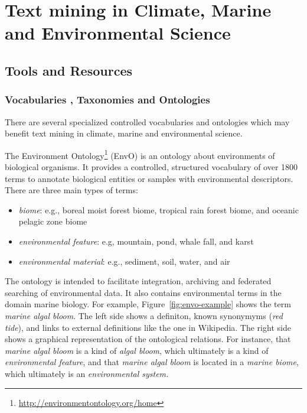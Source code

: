 \chapter{Text mining in Climate, Marine and Environmental Science}



\section{Tools and Resources}

\subsection{Vocabularies , Taxonomies and Ontologies}

There are several specialized controlled vocabularies and ontologies which may benefit text mining in climate, marine and environmental science.
 
The Environment Ontology\footnote{\url{http://environmentontology.org/home}} (EnvO) is an ontology about environments  \citep{Buttigieg2013Environment} of biological organisms.
It provides a controlled, structured vocabulary of over 1800 terms to annotate biological entities or samples with environmental descriptors.
There are three main types of terms:

\begin{itemize}
\item \emph{biome}: e.g., boreal moist forest biome, tropical rain forest biome, and oceanic pelagic zone biome 
\item \emph{environmental feature}: e.g, mountain, pond, whale fall, and karst
\item \emph{environmental material}: e.g., sediment, soil, water, and air
\end{itemize}

\noindent The ontology is intended to facilitate integration, archiving and federated searching of environmental data.
It also contains environmental terms in the domain marine biology.
For example, Figure~\ref{fig:envo-example} shows the term \emph{marine algal bloom}.
The left side shows a definiton, known synonymyms (\emph{red tide}), and links to external definitions like the one in Wikipedia.
The right side shows a graphical representation of the ontological relations.
For instance, that \emph{marine algal bloom} is a kind of \emph{algal bloom}, which ultimately is a kind of \emph{environmental feature}, and that  \emph{marine algal bloom} is located in a\emph{ marine biome}, which ultimately is an \emph{environmental system.}

